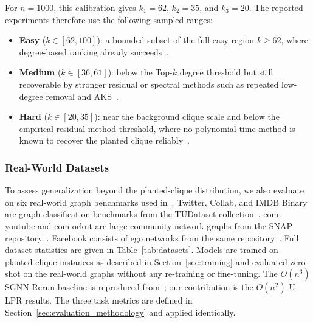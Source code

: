 \documentclass[mathematics,article,submit,pdftex,moreauthors]{Definitions/mdpi}
\begin{document}
For $n=1000$, this calibration gives $k_1=62$, $k_2=35$, and $k_3=20$. The reported
experiments therefore use the following sampled ranges:
\begin{itemize}
  \item \textbf{Easy} ($k\in[62,100]$): a bounded subset of the full easy region
    $k\ge 62$, where degree-based ranking already succeeds~\citep{kucera1995}.
  \item \textbf{Medium} ($k\in[36,61]$): below the Top-$k$ degree threshold but
    still recoverable by stronger residual or spectral methods such
    as repeated low-degree removal and AKS~\citep{alon1998,feige2010}.
  \item \textbf{Hard} ($k\in[20,35]$): near the background clique scale and below
    the empirical residual-method threshold, where no polynomial-time method is
    known to recover the planted clique reliably~\citep{manurangsi2021}.
\end{itemize}

\subsubsection{Real-World Datasets}
\label{sec:realworld_data}

To assess generalization beyond the planted-clique distribution, we also evaluate
on six real-world graph benchmarks used in~\citet{ShohamHRV26}.
Twitter, Collab, and IMDB Binary are graph-classification benchmarks from the
TUDataset collection~\citep{Morris+2020,10.1145/2783258.2783417}.
com-youtube and com-orkut are large community-network graphs from the SNAP
repository~\citep{youtube-orkut,datasets}.
Facebook consists of ego networks from the same
repository~\citep{facebook,datasets}.
Full dataset statistics are given in Table~\ref{tab:datasets}. Models are trained
on planted-clique instances as described in Section~\ref{sec:training} and evaluated
zero-shot on the real-world graphs without any re-training or fine-tuning. The
$O(n^3)$ SGNN Rerun baseline is reproduced from~\citet{ShohamHRV26}; our
contribution is the $O(n^2)$ U-LPR results. The three task metrics are defined in
Section~\ref{sec:evaluation_methodology} and applied identically.
\end{document}

